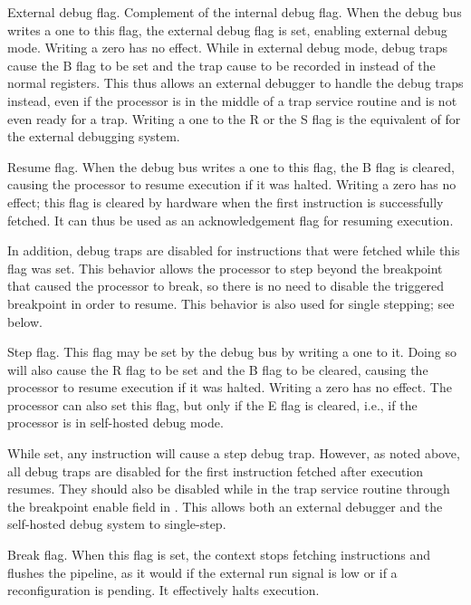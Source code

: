 External debug flag. Complement of the internal debug flag. When the debug bus 
writes a one to this flag, the external debug flag is set, enabling external
debug mode. Writing a zero has no effect. While in external debug mode, debug
traps cause the B flag to be set and the trap cause to be recorded in 
instead of the normal registers. This thus allows an external debugger to handle
the debug traps instead, even if the processor is in the middle of a trap
service routine and is not even ready for a trap. Writing a one to the R or the
S flag is the equivalent of  for the external debugging system.

\debugCanWrite{}

Resume flag. When the debug bus writes a one to this flag, the B flag is
cleared, causing the processor to resume execution if it was halted. Writing a
zero has no effect; this flag is cleared by hardware when the first instruction
is successfully fetched. It can thus be used as an acknowledgement flag for
resuming execution.

In addition, debug traps are disabled for instructions that were fetched while
this flag was set. This behavior allows the processor to step beyond the
breakpoint that caused the processor to break, so there is no need to disable
the triggered breakpoint in order to resume. This behavior is also used for
single stepping; see below.

\debugCanWrite{}
\coreCanWrite{}

Step flag. This flag may be set by the debug bus by writing a one to it. Doing
so will also cause the R flag to be set and the B flag to be cleared, causing
the processor to resume execution if it was halted. Writing a zero has no
effect. The processor can also set this flag, but only if the E flag is cleared,
i.e., if the processor is in self-hosted debug mode.

While set, any instruction will cause a step debug trap. However, as noted
above, all debug traps are disabled for the first instruction fetched after
execution resumes. They should also be disabled while in the trap service
routine through the breakpoint enable field in . This allows both an
external debugger and the self-hosted debug system to single-step.

\debugCanWrite{}

Break flag. When this flag is set, the context stops fetching instructions and
flushes the pipeline, as it would if the external run signal is low or if a
reconfiguration is pending. It effectively halts execution.

